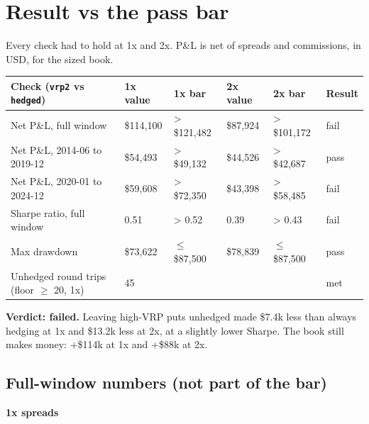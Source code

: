 \documentclass{article}
\begin{document}
\section{Result vs the pass bar}

Every check had to hold at 1x and 2x. P\&L is net of spreads and commissions, in USD, for the sized book.

\begin{center}\small
\begin{tabularx}{\linewidth}{>{\raggedright\arraybackslash}X l l l l l}
\toprule
\textbf{Check (\texttt{vrp2} vs \texttt{hedged})} & \textbf{1x value} & \textbf{1x bar} & \textbf{2x value} & \textbf{2x bar} & \textbf{Result} \\
\midrule
Net P\&L, full window & \$114,100 & > \$121,482 & \$87,924 & > \$101,172 & fail \\
Net P\&L, 2014-06 to 2019-12 & \$54,493 & > \$49,132 & \$44,526 & > \$42,687 & pass \\
Net P\&L, 2020-01 to 2024-12 & \$59,608 & > \$72,350 & \$43,398 & > \$58,485 & fail \\
Sharpe ratio, full window & 0.51 & > 0.52 & 0.39 & > 0.43 & fail \\
Max drawdown & \$73,622 & \ensuremath{\leq} \$87,500 & \$78,839 & \ensuremath{\leq} \$87,500 & pass \\
Unhedged round trips (floor \ensuremath{\geq} 20, 1x) & 45 &  &  &  & met \\
\bottomrule
\end{tabularx}
\end{center}

\textbf{Verdict: failed.} Leaving high-VRP puts unhedged made \$7.4k less than always hedging at 1x and \$13.2k less at 2x, at a slightly lower Sharpe. The book still makes money: +\$114k at 1x and +\$88k at 2x.

\subsection{Full-window numbers (not part of the bar)}

\textbf{1x spreads}
\end{document}
